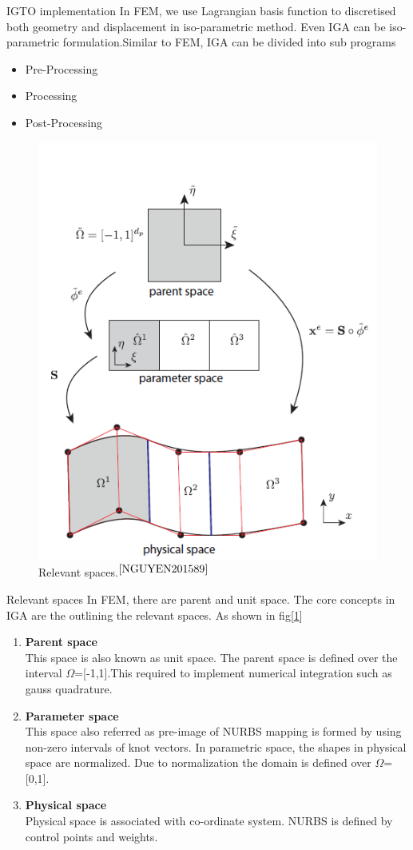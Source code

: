 \documentclass[a4paper,12pt,times]{article}
\begin{document}
\begin{section}{IGTO implementation}
In FEM, we use Lagrangian basis function to discretised both geometry and displacement in iso-parametric method. Even IGA can be iso-parametric formulation.Similar to FEM, IGA can be divided into sub programs

\begin{itemize}
\item Pre-Processing

\item Processing

\item Post-Processing

\end{itemize}
\begin{figure}[h!]
\centering
\includegraphics[width=0.45\linewidth]{relevant_spaces.png}
\caption{ Relevant spaces.$^{\cite{NGUYEN201589}}$}
\label{fig:Relevant spaces}
\end{figure}

\begin{subsection}{Relevant spaces}
In FEM, there are parent and unit space. The core concepts in IGA are the outlining the relevant spaces. As shown in fig[\ref{fig:Relevant spaces}]

\begin{enumerate}
\item \textbf{Parent space} 
\\ This space is also known as unit space. The parent space is defined over the interval $\Omega$=[-1,1].This required to implement numerical integration such as gauss quadrature.

\item \textbf{Parameter space}
\\ This space also referred as pre-image of NURBS mapping is formed by using non-zero intervals of knot vectors. In parametric space, the shapes in physical space are normalized. Due to normalization the domain is defined over   $\Omega$=[0,1].
\item \textbf{Physical space}
\\ Physical space is associated with co-ordinate system. NURBS is defined by control points and weights.


\end{enumerate}
\end{subsection}
\end{section}
\end{document}
